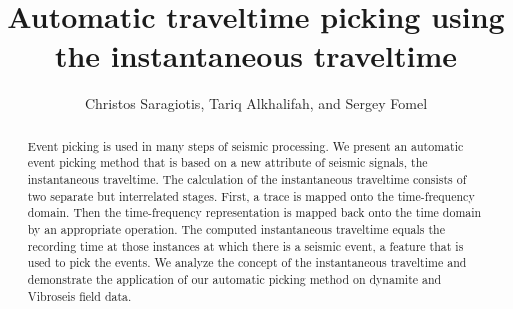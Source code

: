 


\newcommand{\imag}{\mathrm{Im}}

\renewcommand{\thefootnote}{\fnsymbol{footnote}} 
\title{Automatic traveltime picking using the instantaneous traveltime}
\author{Christos Saragiotis\footnotemark[1], Tariq Alkhalifah\footnotemark[1], 
        and Sergey Fomel\footnotemark[2]}

\address{
\footnotemark[1]Physical Sciences and Engineering Division \\
King Abdullah University of Science and Technology \\
Thuwal 23955-6900 \\
Saudi Arabia \\
\footnotemark[2]Bureau of Economic Geology, \\
John A.~and Katherine G.~Jackson School of Geosciences \\
The University of Texas at Austin \\
University Station, Box X \\
Austin, TX 78713-8972 \\
USA}


%
%




\maketitle
\newpage

\begin{abstract}
Event picking is used in many steps of seismic processing. We present an automatic event picking method that is based on a new attribute of seismic signals, the instantaneous traveltime. The calculation of the instantaneous traveltime  consists of two separate but interrelated stages. First, a trace is mapped onto the time-frequency domain. Then the time-frequency representation is mapped back onto the time domain by an appropriate operation. The computed instantaneous traveltime equals the recording time at those instances at which there is a seismic event, a feature that is used to pick the events. 
We analyze the concept of the instantaneous traveltime and demonstrate the application of our automatic picking method on dynamite and Vibroseis field data.
\end{abstract}


